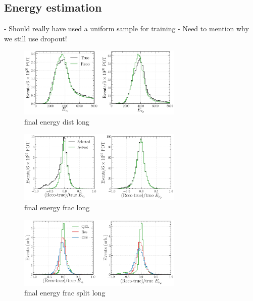 \subsection{Energy estimation} %
\label{sec:cvn_results_energy} %

- Should really have used a uniform sample for training
- Need to mention why we still use dropout!

\begin{figure} %
    \includegraphics[width=0.7\textwidth]{diagrams/6-cvn/chipsnet/final_energy_dists.pdf}
    \caption[final energy dists short]
    {final energy dist long}
    \label{fig:final_energy_dists}
\end{figure}

\begin{figure} %
    \includegraphics[width=0.7\textwidth]{diagrams/6-cvn/chipsnet/final_energy_frac.pdf}
    \caption[final energy frac short]
    {final energy frac long}
    \label{fig:final_energy_frac}
\end{figure}

\begin{figure} %
    \includegraphics[width=0.7\textwidth]{diagrams/6-cvn/chipsnet/final_energy_frac_split.pdf}
    \caption[final energy frac split short]
    {final energy frac split long}
    \label{fig:final_energy_frac_split}
\end{figure}

